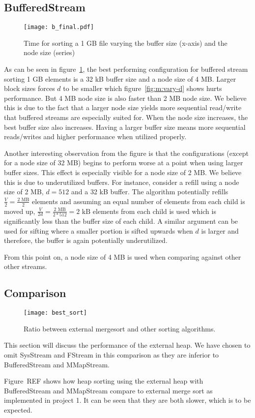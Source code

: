 \subsection{BufferedStream}

\begin{figure}[h!]
  \centering
  \texttt{[image: b\_final.pdf]}
  \caption{Time for sorting a 1 GB file varying the buffer size (x-axis) and the node size (series)}
  \label{fig:b_final}
\end{figure}

As can be seen in figure~\ref{fig:b_final}, the best performing configuration for buffered stream sorting 1 GB elements is a 32 kB buffer size and a node size of 4 MB. Larger block sizes forces $d$ to be smaller which figure~\ref{fig:m:vary-d} shows hurts performance. But 4 MB node size is also faster than 2 MB node size. We believe this is due to the fact that a larger node size yields more sequential read/write that buffered streams are especially suited for. When the node size increases, the best buffer size also increases. Having a larger buffer size means more sequential reads/writes and higher performance when utilized properly.

Another interesting observation from the figure is that the configurations (except for a node size of 32 MB) begins to perform worse at a point when using larger buffer sizes. This effect is especially visible for a node size of 2 MB. We believe this is due to underutilized buffers. For instance, consider a refill using a node size of 2 MB, $d=512$ and a 32 kB buffer. The algorithm potentially refills $\frac{V}{2}=\frac{\textrm{2 MB}}{2}$ elements and assuming an equal number of elements from each child is moved up, $\frac{V}{2d}=\frac{\textrm{2 MB}}{2*512}=\textrm{2 kB}$ elements from each child is used which is significantly less than the buffer size of each child. A similar argument can be used for sifting where a smaller portion is sifted upwards when $d$ is larger and therefore, the buffer is again potentially underutilized.


From this point on, a node size of 4 MB is used when comparing against other other streams.

\subsection{Comparison}

\begin{figure}
  \centering
  \texttt{[image: best\_sort]}
  \caption{Ratio between external mergesort and other sorting algorithms.}
  \label{fig:best_sort}
\end{figure}

This section will discuss the performance of the external heap. We have chosen to omit SysStream and FStream in this comparison as they are inferior to BufferedStream and MMapStream.

Figure~REF shows how heap sorting using the external heap with BufferedStream and MMapStream compare to external merge sort as implemented in project 1. It can be seen that they are both slower, which is to be expected.

